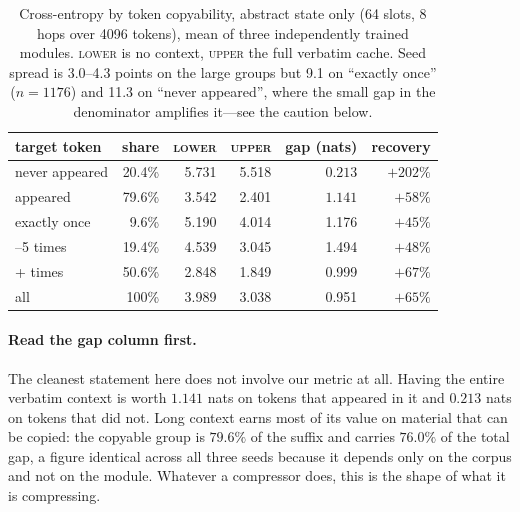 \documentclass[11pt]{article}
\begin{document}
\begin{table}[ht]
\centering
\small
\begin{tabular}{lrrrrr}
\toprule
target token & share & \textsc{lower} & \textsc{upper} & gap (nats) & recovery \\
\midrule
never appeared      & 20.4\% & 5.731 & 5.518 & $\mathbf{0.213}$ & $+202\%$ \\
appeared            & 79.6\% & 3.542 & 2.401 & $\mathbf{1.141}$ & $+58\%$ \\
\quad exactly once  &  9.6\% & 5.190 & 4.014 & 1.176 & $+45\%$ \\
\quad 2--5 times    & 19.4\% & 4.539 & 3.045 & 1.494 & $+48\%$ \\
\quad 6+ times      & 50.6\% & 2.848 & 1.849 & 0.999 & $+67\%$ \\
\midrule
all                 & 100\%  & 3.989 & 3.038 & 0.951 & $+65\%$ \\
\bottomrule
\end{tabular}
\caption{Cross-entropy by token copyability, abstract state only (64 slots,
8 hops over 4096 tokens), mean of three independently trained modules.
\textsc{lower} is no context, \textsc{upper} the full verbatim cache. Seed
spread is 3.0--4.3 points on the large groups but 9.1 on ``exactly once''
($n{=}1176$) and 11.3 on ``never appeared'', where the small gap in the
denominator amplifies it---see the caution below.}
\label{tab:copyability}
\end{table}

\paragraph{Read the gap column first.}
The cleanest statement here does not involve our metric at all. Having the entire
verbatim context is worth $1.141$ nats on tokens that appeared in it and $0.213$
nats on tokens that did not. Long context earns most of its value on material
that can be copied: the copyable group is $79.6\%$ of the suffix and carries
$76.0\%$ of the total gap, a figure identical across all three seeds because it
depends only on the corpus and not on the module. Whatever a compressor does,
this is the shape of what it is compressing.
\end{document}
